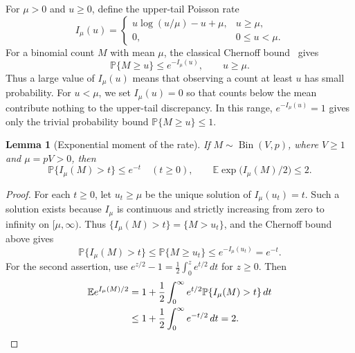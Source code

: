 \documentclass[10pt,a4paper]{amsart}
\numberwithin{equation}{section}
\newtheorem{lemma}[theorem]{Lemma}
\newcommand{\E}{\mathbb E}
\newcommand{\Pp}{\mathbb P}
\begin{document}
For $\mu>0$ and $u\ge0$, define the upper-tail Poisson rate
\begin{equation}\label{eq:rate}
 I_\mu(u)=
 \begin{cases}
 u\log(u/\mu)-u+\mu,&u\ge\mu,\\
 0,&0\le u<\mu.
 \end{cases}
\end{equation}
For a binomial count $M$ with mean $\mu$, the classical Chernoff
bound~\cite[Theorem~2.3.1]{V26} gives
\[
 \Pp\{M\ge u\}\le e^{-I_\mu(u)},\qquad u\ge\mu.
\]
Thus a large value of $I_\mu(u)$ means
that observing a count at least $u$ has small probability.
For $u<\mu$, we set $I_\mu(u)=0$ so that counts below the mean
contribute nothing to the upper-tail discrepancy. In this range,
$e^{-I_\mu(u)}=1$ gives only the trivial probability bound
$\Pp\{M\ge u\}\le1$.

\begin{lemma}[Exponential moment of the rate]\label{lem:rate}
If $M\sim\operatorname{Bin}(V,p)$, where $V\ge1$ and $\mu=pV>0$, then
\[
 \Pp\{I_\mu(M)>t\}\le e^{-t}\quad(t\ge0),
 \qquad
 \E\exp\bigl(I_\mu(M)/2\bigr)\le2.
\]
\end{lemma}
\begin{proof}
For each $t\ge0$, let $u_t\ge\mu$ be the unique solution of
$I_\mu(u_t)=t$. Such a solution exists because $I_\mu$ is continuous
and strictly increasing from zero to infinity on $[\mu,\infty)$.
Thus $\{I_\mu(M)>t\}=\{M>u_t\}$, and the Chernoff bound above gives
\[
 \Pp\{I_\mu(M)>t\}
 \le\Pp\{M\ge u_t\}
 \le e^{-I_\mu(u_t)}=e^{-t}.
\]
For the second assertion, use
$e^{z/2}-1=\frac12\int_0^z e^{t/2}\,dt$ for $z\ge0$.
Then
\begin{align*}
 \E e^{I_\mu(M)/2}
 &=1+\frac12\int_0^\infty e^{t/2}
             \Pp\{I_\mu(M)>t\}\,dt\\
 &\le1+\frac12\int_0^\infty e^{-t/2}\,dt=2.
 \qedhere
\end{align*}
\end{proof}
\end{document}
